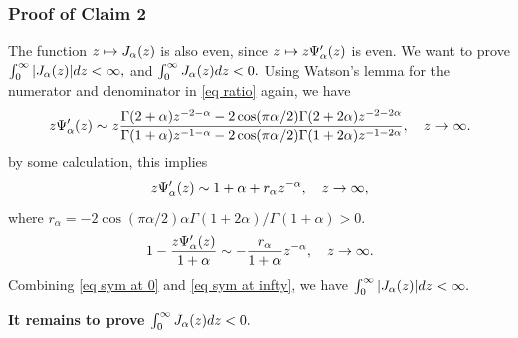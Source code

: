 \documentclass[12pt]{amsart}
\begin{document}
\subsubsection{Proof of Claim 2} 
The function $z \mapsto J_\alpha(z)$ is also even, since $z \mapsto z \Psi_\alpha'(z)$ is even. We want to prove 
$\int_0^\infty|J_\alpha(z)|dz < \infty,$ and $  \int_0^\infty J_\alpha (z)dz < 0.$
Using Watson's lemma for the numerator and denominator in \eqref{eq ratio} again, we have 
\begin{equation}
\label{eq waston again}
    z\Psi'_\alpha (z) \sim z \frac{ \Gamma(2+\alpha)z^{-2-\alpha } - 2 \cos(\pi \alpha/2) \Gamma(2 + 2\alpha) z^{-2-2\alpha}}{ \Gamma(1+\alpha)z^{-1-\alpha } - 2 \cos(\pi \alpha/2) \Gamma(1 + 2\alpha) z^{-1-2\alpha}}  , \quad z \rightarrow \infty. 
\end{equation}
by some calculation, this implies 
\begin{equation}
     z\Psi'_\alpha (z) \sim  1+\alpha + r_\alpha z ^{-\alpha}, \quad z \rightarrow \infty, 
\end{equation}
where $r_\alpha = - 2  \cos(\pi \alpha/2)  \alpha \Gamma(1+2\alpha)/\Gamma(1+\alpha) > 0.$ 
\begin{equation}
\label{eq sym at infty}
    1 - \frac{z\Psi'_\alpha (z)}{1 + \alpha} \sim  - \frac{r_\alpha}{1+\alpha} z ^{-\alpha} , \quad z \rightarrow \infty. 
\end{equation}
Combining \eqref{eq sym at 0} and \eqref{eq sym at infty}, we have $\int_0^\infty|J_\alpha(z)|dz < \infty.$  

\textbf{It remains to prove $\int_0^\infty J_\alpha (z)dz < 0.$ }
\end{document}
